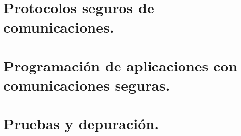 \documentclass[a4paper,12pt,spanish]{sphinxmanual}
\begin{document}
\section{Protocolos seguros de comunicaciones.}
\label{textos/tema5:protocolos-seguros-de-comunicaciones}

\section{Programación de aplicaciones con comunicaciones seguras.}
\label{textos/tema5:programacion-de-aplicaciones-con-comunicaciones-seguras}

\section{Pruebas y depuración.}
\label{textos/tema5:pruebas-y-depuracion}


\renewcommand{\indexname}{Índice}
\printindex
\end{document}

